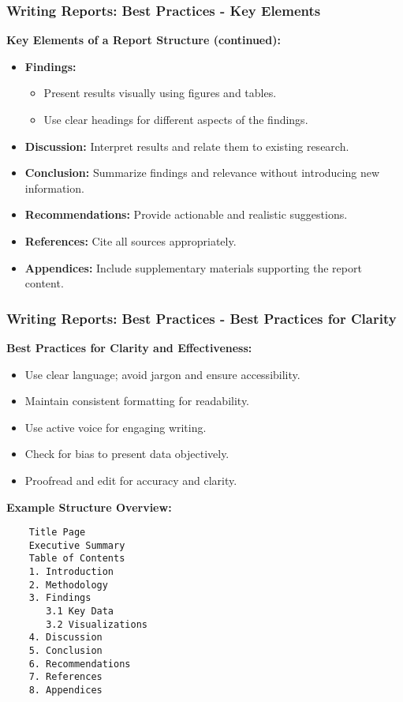 \documentclass{beamer}
\begin{document}
\begin{frame}[fragile]
    \frametitle{Writing Reports: Best Practices - Key Elements}
    
    \textbf{Key Elements of a Report Structure (continued):}
    
    \begin{itemize}
        \item \textbf{Findings:}
            \begin{itemize}
                \item Present results visually using figures and tables.
                \item Use clear headings for different aspects of the findings.
            \end{itemize}
        \item \textbf{Discussion:} Interpret results and relate them to existing research.
        \item \textbf{Conclusion:} Summarize findings and relevance without introducing new information.
        \item \textbf{Recommendations:} Provide actionable and realistic suggestions.
        \item \textbf{References:} Cite all sources appropriately.
        \item \textbf{Appendices:} Include supplementary materials supporting the report content.
    \end{itemize}
\end{frame}

\begin{frame}[fragile]
    \frametitle{Writing Reports: Best Practices - Best Practices for Clarity}
    
    \textbf{Best Practices for Clarity and Effectiveness:}
    
    \begin{itemize}
        \item Use clear language; avoid jargon and ensure accessibility.
        \item Maintain consistent formatting for readability.
        \item Use active voice for engaging writing.
        \item Check for bias to present data objectively.
        \item Proofread and edit for accuracy and clarity.
    \end{itemize}

    \textbf{Example Structure Overview:}
    \begin{verbatim}
    Title Page
    Executive Summary
    Table of Contents
    1. Introduction
    2. Methodology
    3. Findings
       3.1 Key Data
       3.2 Visualizations
    4. Discussion
    5. Conclusion
    6. Recommendations
    7. References
    8. Appendices
    \end{verbatim}
\end{frame}
\end{document}
